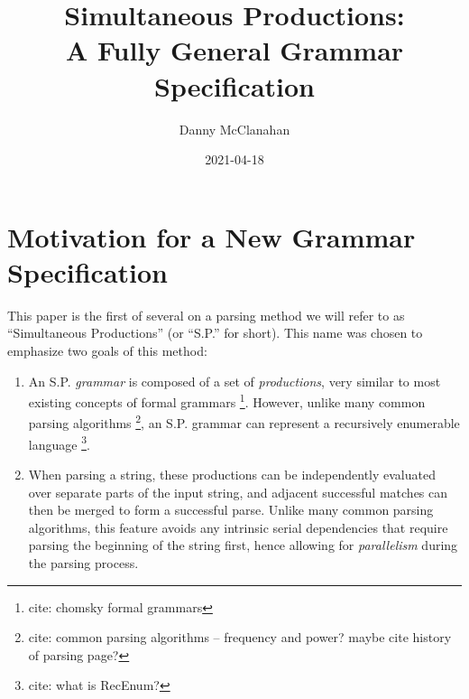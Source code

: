 \documentclass[10pt]{article}
\title{Simultaneous Productions: \\ A Fully General Grammar Specification}
\date{2021-04-18}
\author{Danny McClanahan}
\newcommand{\todocite}[1]{\footnote{cite: #1}}
\begin{document}
\maketitle

\section{Motivation for a New Grammar Specification}
\label{sec:motivation}

This paper is the first of several on a parsing method we will refer to as ``Simultaneous Productions'' (or ``S.P.'' for short). This name was chosen to emphasize two goals of this method:
\begin{enumerate}
  \item An S.P. \textit{grammar} is composed of a set of \textit{productions}, very similar to most existing concepts of formal grammars \todocite{chomsky formal grammars}. However, unlike many common parsing algorithms \todocite{common parsing algorithms -- frequency and power? maybe cite history of parsing page?}, an S.P. grammar can represent a recursively enumerable language \todocite{what is RecEnum?}.
  \item When parsing a string, these productions can be independently evaluated over separate parts of the input string, and adjacent successful matches can then be merged to form a successful parse. Unlike many common parsing algorithms, this feature avoids any intrinsic serial dependencies that require parsing the beginning of the string first, hence allowing for \textit{parallelism} during the parsing process.
\end{enumerate}
\end{document}
